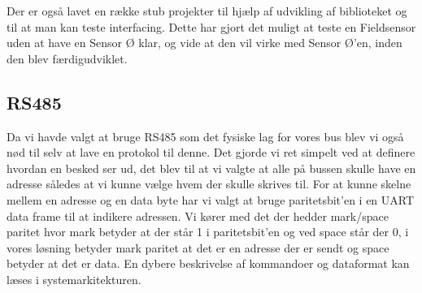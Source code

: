 Der er også lavet en række stub projekter til hjælp af udvikling af biblioteket og til at man kan teste interfacing. Dette har gjort det muligt at teste en Fieldsensor uden at have en Sensor Ø klar, og vide at den vil virke med Sensor Ø'en, inden den blev færdigudviklet.

\subsection{RS485}
Da vi havde valgt at bruge RS485 som det fysiske lag for vores bus blev vi også nød til selv at lave en protokol til denne. Det gjorde vi ret simpelt ved at definere hvordan en besked ser ud, det blev til at vi valgte at alle på bussen skulle have en adresse således at vi kunne vælge hvem der skulle skrives til. For at kunne skelne mellem en adresse og en data byte har vi valgt at bruge paritetsbit'en i en UART data frame til at indikere adressen. Vi kører med det der hedder mark/space paritet hvor mark betyder at der står 1 i paritetsbit'en og ved space står der 0, i vores løsning betyder mark paritet at det er en adresse der er sendt og space betyder at det er data. En dybere beskrivelse af kommandoer og dataformat kan læses i systemarkitekturen.